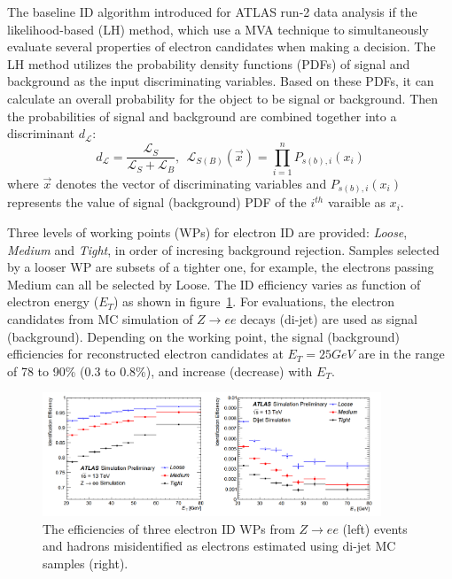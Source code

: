 The baseline ID algorithm introduced for ATLAS run-2 data analysis if the likelihood-based (LH) method, which use a MVA technique to simultaneously evaluate several properties of electron candidates when making a decision.
The LH method utilizes the probability density functions (PDFs) of signal and background as the input discriminating variables.
Based on these PDFs, it can calculate an overall probability for the object to be signal or background.
Then the probabilities of signal and background are combined together into a discriminant $d_{\mathcal{L}}$:
\begin{equation}
	d_{\mathcal{L}} = \frac{\mathcal{L}_{S}}{\mathcal{L}_{S} + \mathcal{L}_{B}},
	~~ \mathcal{L}_{S(B)}(\vec{x}) = \prod_{i=1}^{n} P_{s(b),i}(x_{i})	
\end{equation}
where $\vec{x}$ denotes the vector of discriminating variables and $P_{s(b),i}(x_{i})$ represents the value of signal (background) PDF of the $i^{th}$ varaible as $x_{i}$.

Three levels of working points (WPs) for electron ID are provided: \textit{Loose}, \textit{Medium} and \textit{Tight}, in order of incresing background rejection.
Samples selected by a looser WP are subsets of a tighter one, for example, the electrons passing Medium can all be selected by Loose.
The ID efficiency varies as function of electron energy ($E_{T}$) as shown in figure~\ref{fig:ele_IDeff}.
For evaluations, the electron candidates from MC simulation of $Z \rightarrow ee$ decays (di-jet) are used as signal (background).
Depending on the working point, the signal (background) efficiencies for reconstructed electron candidates at $E_{T} = 25 GeV$ are in the range of 78 to 90\% (0.3 to 0.8\%), and increase (decrease) with $E_{T}$.
\begin{figure}[!htb]
  \centering
  \includegraphics[width=0.9\textwidth]{figures/Simulation/ele_id_eff.png}
  \caption{The efficiencies of three electron ID WPs from $Z \rightarrow ee$ (left) events and hadrons misidentified as electrons estimated using di-jet MC samples (right).}
  \label{fig:ele_IDeff}
\end{figure}

